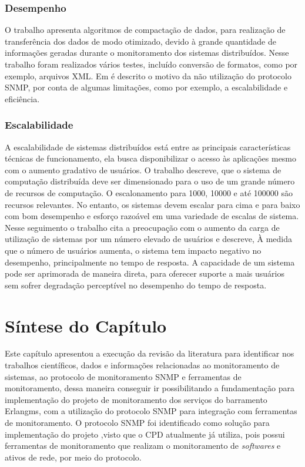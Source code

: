 \subsubsection{Desempenho}

O trabalho \cite{wang2016improvements} apresenta algoritmos de compactação de dados, para realização de transferência dos dados de modo otimizado, devido à grande quantidade de informações geradas durante o monitoramento dos sistemas distribuídos. Nesse trabalho foram realizados vários testes, incluído conversão de formatos, como por exemplo, arquivos XML. Em \cite{kotsopoulos2008soa} é descrito o motivo da não utilização do protocolo SNMP, por conta de algumas limitações, como por exemplo, a escalabilidade e eficiência. 

\subsubsection{Escalabilidade}

A escalabilidade de sistemas distribuídos está entre as principais características técnicas de funcionamento, ela busca disponibilizar o acesso às aplicações mesmo com o aumento gradativo de usuários. O trabalho \cite{1015543} descreve, que o sistema de computação distribuída deve ser dimensionado para o uso de um grande número de recursos de computação. O escalonamento para 1000, 10000 e até 100000 são recursos relevantes. No entanto, os sistemas devem escalar para cima e para baixo com bom desempenho e esforço razoável em uma variedade de escalas de sistema. Nesse seguimento o trabalho \cite{4359423} cita a preocupação com o aumento da carga de utilização de sistemas por um número elevado de usuários e descreve, À medida que o número de usuários aumenta, o sistema tem impacto negativo no desempenho, principalmente no tempo de resposta. A capacidade de um sistema pode ser aprimorada de maneira direta, para oferecer suporte a mais usuários sem sofrer degradação perceptível no desempenho do tempo de resposta. 

\section{Síntese do Capítulo}

Este capítulo apresentou a execução da revisão da literatura para identificar nos trabalhos científicos, dados e informações relacionadas ao monitoramento de sistemas, ao protocolo de monitoramento \acrshort{SNMP} e ferramentas de monitoramento, dessa maneira conseguir ir possibilitando a fundamentação para implementação do projeto de monitoramento dos serviços do barramento Erlangms, com a utilização do protocolo \acrshort{SNMP} para integração com ferramentas de monitoramento. O protocolo \acrshort{SNMP} foi identificado como solução para implementação do projeto ,visto que o \acrshort{CPD} atualmente já utiliza, pois  possui ferramentas de monitoramento que realizam o monitoramento de \textit{softwares} e ativos de rede, por meio do protocolo. 


